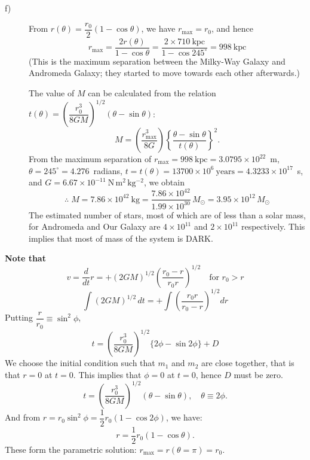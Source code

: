 \begin{description}
\item[f)] From $r(\theta) = \dfrac{r_0}{2}(1-\cos\theta)$, we have
  $r_{\mathrm{max}} = r_0$, and hence
  \begin{equation*}
  r_{\mathrm{max}} = \frac{2r(\theta)}{1-\cos\theta}
  = \frac{2 \times 710~\mathrm{kpc}}{1 - \cos 245^\circ}
  = 998~\mathrm{kpc}
  \tag*{[5]}
  \end{equation*}
  (This is the maximum separation between the Milky-Way Galaxy and Andromeda
  Galaxy; they started to move towards each other afterwards.)

  The value of $M$ can be calculated from the relation
  $t(\theta) = \left(\dfrac{r_0^3}{8GM}\right)^{1/2}(\theta - \sin\theta)$:
  \[
  M = \left(\frac{r_{\mathrm{max}}^3}{8G}\right)
      \left\{\frac{\theta - \sin\theta}{t(\theta)}\right\}^{2}.
  \]
  From the maximum separation of
  $r_{\mathrm{max}} = 998~\mathrm{kpc} = 3.0795 \times 10^{22}$~m,
  $\theta = 245^\circ = 4.276$~radians,
  $t = t(\theta) = 13700 \times 10^{6}~\mathrm{years}
     = 4.3233 \times 10^{17}$~s, and
  $G = 6.67 \times 10^{-11}~\mathrm{N\,m^2\,kg^{-2}}$, we obtain
  \begin{equation*}
  \therefore\; M = 7.86 \times 10^{42}~\mathrm{kg}
  = \frac{7.86 \times 10^{42}}{1.99 \times 10^{30}}\,M_\odot
  = 3.95 \times 10^{12}\,M_\odot
  \tag*{[5]}
  \end{equation*}
  The estimated number of stars, most of which are of less than a solar mass,
  for Andromeda and Our Galaxy are $4 \times 10^{11}$ and $2 \times 10^{11}$
  respectively. This implies that most of mass of the system is DARK.
\end{description}

\medskip
\noindent\textbf{Note that}
\[
v = \frac{d}{dt}r = +(2GM)^{1/2}\left(\frac{r_0 - r}{r_0 r}\right)^{1/2}
\quad\text{for } r_0 > r
\]
\[
\int (2GM)^{1/2}\,dt = +\int \left(\frac{r_0 r}{r_0 - r}\right)^{1/2} dr
\]
Putting $\dfrac{r}{r_0} \equiv \sin^2\phi$,
\[
t = \left(\frac{r_0^3}{8GM}\right)^{1/2}\{2\phi - \sin 2\phi\} + D
\]
We choose the initial condition such that $m_1$ and $m_2$ are close together,
that is that $r = 0$ at $t = 0$. This implies that $\phi = 0$ at $t = 0$,
hence $D$ must be zero.
\[
t = \left(\frac{r_0^3}{8GM}\right)^{1/2}(\theta - \sin\theta),
\quad \theta \equiv 2\phi.
\]
And from $r = r_0 \sin^2\phi = \dfrac{1}{2}r_0(1 - \cos 2\phi)$, we have:
\[
r = \frac{1}{2}r_0(1 - \cos\theta).
\]
These form the parametric solution:
$r_{\mathrm{max}} = r(\theta = \pi) = r_0$.

